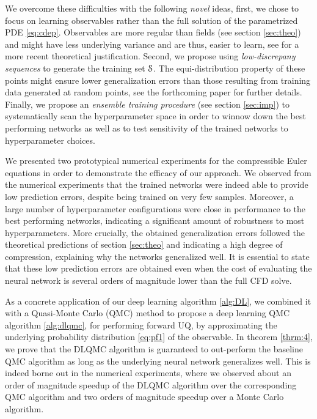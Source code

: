 \documentclass[a4paper]{article}
\numberwithin{equation}{section}
\numberwithin{equation}{section}
\theoremstyle{definition}
\theoremstyle{myremarkstyle}
\newcommand{\train}{\EuScript{S}}
\begin{document}
We overcome these difficulties with the following \emph{novel} ideas, first,  we chose to focus on learning observables rather than the full solution of the parametrized PDE \eqref{eq:cdep}. Observables are more regular than fields (see section \ref{sec:theo}) and might have less underlying variance and are thus, easier to learn, see \cite{LMM1} for a more recent theoretical justification. Second, we propose using \emph{low-discrepany sequences} to generate the training set $\train$. The equi-distribution property of these points might ensure lower generalization errors than those resulting from training data generated at random points, see the forthcoming paper \cite{RM1} for further details. Finally, we propose an \emph{ensemble training procedure} (see section \ref{sec:imp}) to systematically scan the hyperparameter space in order to winnow down the best performing networks as well as to test sensitivity of the trained networks to hyperparameter choices. 

We presented two prototypical numerical experiments for the compressible Euler equations in order to demonstrate the efficacy of our approach. We observed from the numerical experiments that the trained networks were indeed able to provide low prediction errors, despite being trained on very few samples. Moreover, a large number of hyperparameter configurations were close in performance to the best performing networks, indicating a significant amount of robustness to most hyperparameters. More crucially, the obtained generalization errors followed the theoretical predictions of section \ref{sec:theo} and indicating a high degree of compression, explaining why the networks generalized well. It is essential to state that these low prediction errors are obtained even when the cost of evaluating the neural network is several orders of magnitude lower than the full CFD solve. 

As a concrete application of our deep learning algorithm \ref{alg:DL}, we combined it with a Quasi-Monte Carlo (QMC) method to propose a deep learning QMC algorithm \ref{alg:dlqmc}, for performing forward UQ, by approximating the underlying probability distribution \eqref{eq:pf1} of the observable. In theorem \ref{thrm:4}, we prove that the DLQMC algorithm is guaranteed to out-perform the baseline QMC algorithm as long as the underlying neural network generalizes well. This is indeed borne out in the numerical experiments, where we observed about an order of magnitude speedup of the DLQMC algorithm over the corresponding QMC algorithm and two orders of magnitude speedup over a Monte Carlo algorithm. 
\end{document}
